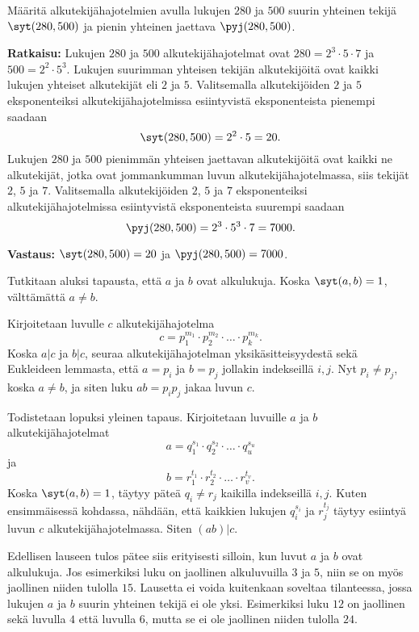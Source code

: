 \begin{esimerkki}
Määritä alkutekijähajotelmien avulla lukujen $280$ ja $500$
suurin yhteinen tekijä $\syt(280, 500)$ ja pienin yhteinen
jaettava $\pyj(280, 500)$.

{\bf Ratkaisu:}
Lukujen $280$ ja $500$ alkutekijähajotelmat ovat $280 = 2^3
\cdot 5\cdot 7$ ja $500 = 2^2\cdot 5^3$. Lukujen suurimman
yhteisen tekijän alkutekijöitä ovat kaikki lukujen yhteiset
alkutekijät eli $2$ ja $5$. Valitsemalla alkutekijöiden $2$
ja $5$ eksponenteiksi alkutekijähajotelmissa esiintyvistä
eksponenteista pienempi saadaan
\[
\syt(280, 500) = 2^2 \cdot 5 = 20.
\]
Lukujen $280$ ja $500$ pienimmän yhteisen jaettavan alkutekijöitä
ovat kaikki ne alkutekijät, jotka ovat jommankumman luvun
alkutekijähajotelmassa, siis tekijät $2$, $5$ ja $7$.
Valitsemalla alkutekijöiden $2$, $5$ ja $7$ eksponenteiksi
alkutekijähajotelmissa esiintyvistä eksponenteista suurempi
saadaan
\[
\pyj(280, 500) = 2^3\cdot 5^3 \cdot 7 = 7000.
\]

{\bf Vastaus:} $\syt(280, 500) = 20$ ja $\pyj(280, 500) = 7000$.
\end{esimerkki}


\begin{todistus}
Tutkitaan aluksi tapausta, että $a$ ja $b$ ovat alkulukuja. Koska $\syt(a, b)=1$, välttämättä $a\neq b$.

Kirjoitetaan luvulle $c$ alkutekijähajotelma
\[
c=  p_1^{m_1} \cdot p_2^{m_2} \cdot \ldots \cdot p_k^{m_k}.
\]
Koska $a|c$ ja $b|c$, seuraa alkutekijähajotelman yksikäsitteisyydestä sekä Eukleideen lemmasta, että $a=p_i$ ja $b=p_j$ jollakin indekseillä $i, j$. Nyt $p_i\neq p_j$, koska $a\neq b$, ja siten luku $ab=p_ip_j$ jakaa luvun $c$.

Todistetaan lopuksi yleinen tapaus. Kirjoitetaan luvuille $a$ ja $b$ alkutekijähajotelmat
\[
a=q_1^{s_1} \cdot q_2^{s_2} \cdot \ldots \cdot q_u^{s_u}
\]
ja
\[
b=r_1^{t_1} \cdot r_2^{t_2} \cdot \ldots \cdot r_v^{t_v}.
\]
Koska $\syt(a, b)=1$, täytyy päteä $q_i\neq r_j$ kaikilla indekseillä $i, j$. Kuten ensimmäisessä kohdassa, nähdään, että kaikkien lukujen $q_i^{s_i}$ ja $r_j^{t_j}$ täytyy esiintyä luvun $c$ alkutekijähajotelmassa. Siten $(ab)|c$.
\end{todistus}

Edellisen lauseen tulos pätee siis erityisesti silloin, kun luvut $a$ ja $b$ ovat alkulukuja. Jos esimerkiksi luku on jaollinen alkuluvuilla $3$ ja $5$, niin se on myös jaollinen niiden tulolla $15$. Lausetta ei voida kuitenkaan soveltaa tilanteessa, jossa lukujen $a$ ja $b$ suurin yhteinen tekijä ei ole yksi. Esimerkiksi luku $12$ on jaollinen sekä luvulla $4$ että luvulla $6$, mutta se ei ole jaollinen niiden tulolla $24$.

